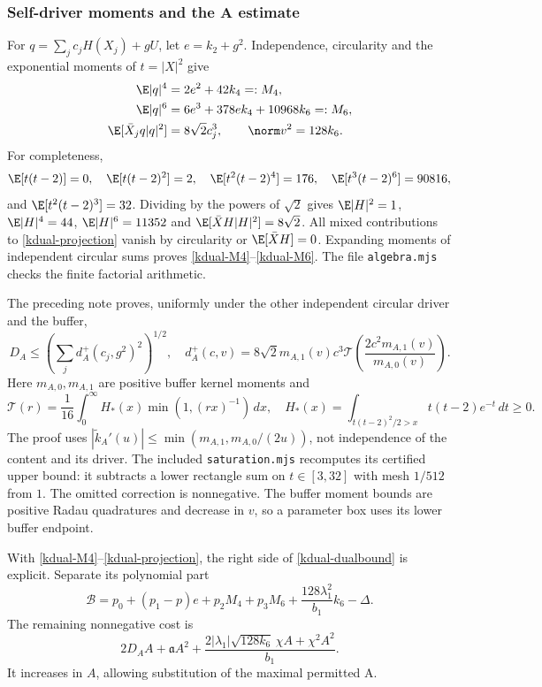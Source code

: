 \subsubsection{Self-driver moments and the A estimate}
For $q=\sum_jc_jH(X_j)+gU$, let $e=k_2+g^2$. Independence,
circularity and the exponential moments of $t=|X|^2$ give
\begin{align}
\E|q|^4&=2e^2+42k_4=:M_4,\label{kdual-M4}\\
\E|q|^6&=6e^3+378ek_4+10968k_6=:M_6,\label{kdual-M6}\\
\E[\bar X_jq|q|^2]&=8\sqrt2c_j^3,\qquad
\norm v^2=128k_6.\label{kdual-projection}
\end{align}
For completeness,
\[
\E[t(t-2)]=0,\quad \E[t(t-2)^2]=2,\quad
\E[t^2(t-2)^4]=176,\quad \E[t^3(t-2)^6]=90816,
\]
and $\E[t^2(t-2)^3]=32$. Dividing by the powers of $\sqrt2$
gives $\E|H|^2=1$, $\E|H|^4=44$, $\E|H|^6=11352$ and
$\E[\bar XH|H|^2]=8\sqrt2$. All mixed contributions to
\eqref{kdual-projection} vanish by circularity or $\E[\bar XH]=0$.
Expanding moments of independent circular sums proves \eqref{kdual-M4}--\eqref{kdual-M6}.
The file \texttt{algebra.mjs} checks the finite factorial arithmetic.

The preceding note proves, uniformly under the other independent
circular driver and the buffer,
\[
D_A\le\left(\sum_j d_A^+(c_j,g^2)^2\right)^{1/2},\quad
d_A^+(c,v)=8\sqrt2m_{A,1}(v)c^3
\mathcal T\!\left(\frac{2c^2m_{A,1}(v)}{m_{A,0}(v)}\right).
\]
Here $m_{A,0},m_{A,1}$ are positive buffer kernel moments and
\[
\mathcal T(r)=\frac1{16}\int_0^\infty H_*(x)\min(1,(rx)^{-1})\,d x,
\quad H_*(x)=\int_{t(t-2)^2/2>x}t(t-2)e^{-t}\,d t\ge0.
\]
The proof uses $|\widetilde k_A'(u)|\le\min(m_{A,1},m_{A,0}/(2u))$,
not independence of the content and its driver.
The included \texttt{saturation.mjs} recomputes its certified upper
bound: it subtracts a lower rectangle sum on $t\in[3,32]$ with mesh
$1/512$ from $1$. The omitted correction is nonnegative.
The buffer moment bounds are positive Radau quadratures and decrease
in $v$, so a parameter box uses its lower buffer endpoint.

With \eqref{kdual-M4}--\eqref{kdual-projection}, the right side of \eqref{kdual-dualbound}
is explicit. Separate its polynomial part
\begin{equation}\label{kdual-Bpoly}
\mathcal B=p_0+(p_1-p)e+p_2M_4+p_3M_6+
\frac{128\lambda_1^2}{b_1}k_6-\Delta.
\end{equation}
The remaining nonnegative cost is
\begin{equation}\label{kdual-Acost}
2D_AA+\mathfrak a A^2+
\frac{2|\lambda_1|\sqrt{128k_6}\,\chi A+\chi^2A^2}{b_1}.
\end{equation}
It increases in $A$, allowing substitution of the maximal permitted A.

